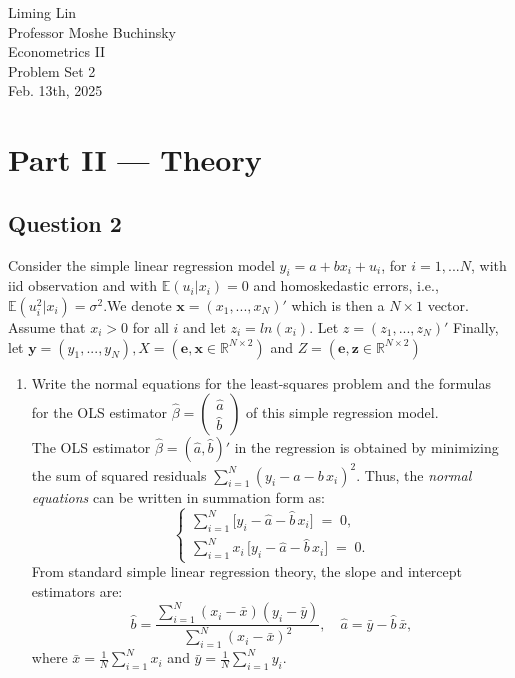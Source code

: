 \documentclass[12pt]{article}
\begin{document}
\begin{flushleft}

Liming Lin\\
Professor Moshe Buchinsky\\
Econometrics II\\
Problem Set 2\\
Feb. 13th, 2025\\

\section*{Part II --- Theory}
\subsection*{Question 2}
Consider the simple linear regression model $y_i=a+bx_i+u_i$, for $i=1,...N$, with iid observation and with $\mathbb{E}(u_i|x_i)=0$ and homoskedastic errors, i.e., $\mathbb{E}(u_i^2|x_i)=\sigma^2$.We denote $\textbf{x}=(x_1,...,x_N)'$ which is then a $N \times 1$ vector. Assume that $x_i>0$ for all $i$ and let $z_i=ln(x_i)$. Let $z=(z_1,...,z_N)'$  Finally, let $\textbf{y}=(y_1,...,y_N), X=(\textbf{e},\textbf{x}\in \mathbb{R}^{N \times 2})$ and $Z=(\textbf{e},\textbf{z}\in \mathbb{R}^{N \times 2} )$
\begin{enumerate}
    \item Write the normal equations for the least-squares problem and the formulas for the OLS estimator $\hat{\beta}=\begin{pmatrix} \hat{a}\\\hat{b} \end{pmatrix}$ of this simple regression model.\\
    The OLS estimator \(\hat{\beta} = (\hat{a},\hat{b})'\) in the regression is obtained by minimizing the sum of squared residuals 
    \(\sum_{i=1}^N (y_i - a - b\,x_i)^2\).  Thus, the \emph{normal equations} can be written in summation form as:
    \[
\begin{cases}
\displaystyle 
\sum_{i=1}^N \bigl[y_i - \hat{a} - \hat{b}\,x_i\bigr] \;=\; 0,\\[6pt]
\displaystyle 
\sum_{i=1}^N x_i\,\bigl[y_i - \hat{a} - \hat{b}\,x_i\bigr] \;=\; 0.
\end{cases}
    \]
From standard simple linear regression theory, the slope and intercept estimators are:
\[
\hat{b} 
= 
\frac{\sum_{i=1}^N (x_i - \bar{x})(y_i - \bar{y})}
     {\sum_{i=1}^N (x_i - \bar{x})^2},
\quad
\hat{a} = \bar{y} - \hat{b}\,\bar{x},
\]
where \(\bar{x} = \frac{1}{N}\sum_{i=1}^N x_i\) and \(\bar{y} = \frac{1}{N}\sum_{i=1}^N y_i\).


\end{enumerate}
\end{flushleft}
\end{document}
